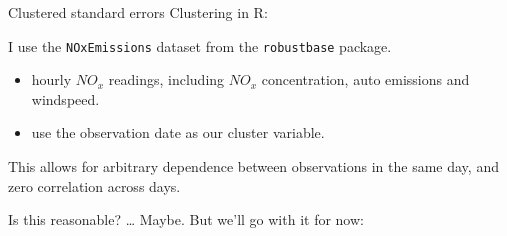 \documentclass[
  ignorenonframetext,
]{beamer}
\begin{document}
\begin{frame}[fragile]{Clustered standard errors}
\protect\hypertarget{clustered-standard-errors-4}{}
Clustering in R:

I use the \texttt{NOxEmissions} dataset from the \texttt{robustbase}
package.

\begin{itemize}
\item
  hourly \(NO_x\) readings, including \(NO_x\) concentration, auto
  emissions and windspeed.
\item
  use the observation date as our cluster variable.
\end{itemize}

This allows for arbitrary dependence between observations in the same
day, and zero correlation across days.

Is this reasonable? \ldots{} Maybe. But we'll go with it for now:
\end{frame}
\end{document}
